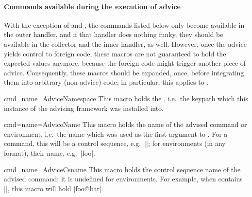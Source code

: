 \documentclass[a4paper,11pt]{article}
\begin{document}
\paragraph{Commands available during the execution of advice}

With the exception of  and
, the commands listed below only become
available in the outer handler, and if that handler does nothing funky, they
should be available in the collector and the inner handler, as well.  However,
once the advice yields control to foreign code, these macros are not guaranteed
to hold the expected values anymore, because the foreign code might trigger
another piece of advice.  Consequently, these macros should be expanded, once,
before integrating them into arbitrary (non-advice) code; in particular, this
applies to .

\begin{doc}{cmd={name=AdviceNamespace}}
  This macro holds the , i.e.\ the keypath which this instance
  of the advising framework was installed into.
\end{doc}

\begin{doc}{cmd={name=AdviceName}}
  This macro holds the name of the advised command or environment, i.e.\ the
  name which was used as the first argument to .  For a command,
  this will be a control sequence, e.g.\ |\foo|; for environments (in any
   format), their name, e.g.\ |foo|.
\end{doc}

\begin{doc}{cmd={name=AdviceCsname}}
  This macro holds the control sequence name of the advised command; it is
  undefined for environments.  For example, when  contains
  |\foo@bar|, this macro will hold |foo@bar|.
\end{doc}

\end{document}
